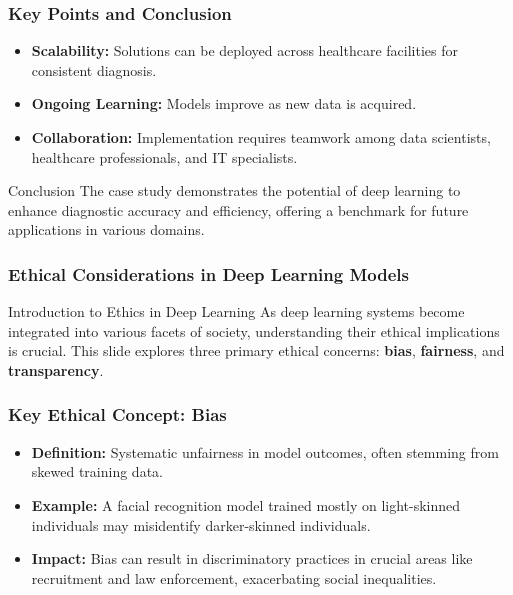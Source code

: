 \documentclass[aspectratio=169]{beamer}
\begin{document}
\begin{frame}
    \frametitle{Key Points and Conclusion}
    \begin{itemize}
        \item \textbf{Scalability:} Solutions can be deployed across healthcare facilities for consistent diagnosis.
        \item \textbf{Ongoing Learning:} Models improve as new data is acquired.
        \item \textbf{Collaboration:} Implementation requires teamwork among data scientists, healthcare professionals, and IT specialists.
    \end{itemize}

    \begin{block}{Conclusion}
        The case study demonstrates the potential of deep learning to enhance diagnostic accuracy and efficiency, offering a benchmark for future applications in various domains.
    \end{block}
\end{frame}

\begin{frame}[fragile]
    \frametitle{Ethical Considerations in Deep Learning Models}
    
    \begin{block}{Introduction to Ethics in Deep Learning}
    As deep learning systems become integrated into various facets of society, understanding their ethical implications is crucial. This slide explores three primary ethical concerns: \textbf{bias}, \textbf{fairness}, and \textbf{transparency}.
    \end{block}
\end{frame}

\begin{frame}[fragile]
    \frametitle{Key Ethical Concept: Bias}
    
    \begin{itemize}
        \item \textbf{Definition:} Systematic unfairness in model outcomes, often stemming from skewed training data.
        \item \textbf{Example:} A facial recognition model trained mostly on light-skinned individuals may misidentify darker-skinned individuals.
        \item \textbf{Impact:} Bias can result in discriminatory practices in crucial areas like recruitment and law enforcement, exacerbating social inequalities.
    \end{itemize}
\end{frame}
\end{document}
